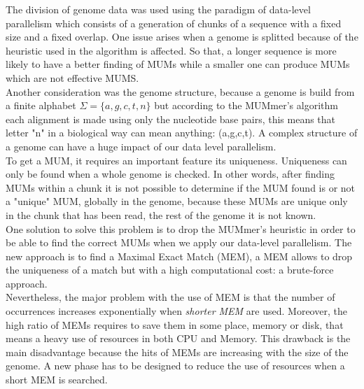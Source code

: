 \documentclass[3p,times]{elsarticle}
\begin{document}
The division of genome data was used using the paradigm of data-level parallelism which consists of a generation of chunks of a sequence with a fixed size and a fixed overlap. One issue arises when a genome is splitted because of the heuristic used in the algorithm is affected. So that, a longer sequence is more likely to have a better finding of MUMs while a smaller one can produce MUMs which are not effective MUMS.\\
Another consideration was the genome structure, because a genome is build from a finite alphabet $\Sigma=\{a,g,c,t,n\}$ but according to the MUMmer's algorithm each alignment is made using only the nucleotide base pairs, this means that letter "n" in a biological way can mean anything: (a,g,c,t). A complex structure of a genome can have a huge impact of our data level parallelism.\\
To get a MUM, it requires an important feature its uniqueness. 
Uniqueness can only be found when a whole genome is checked.
In other words, after finding MUMs within a chunk it is not possible to determine if the MUM found is or not a "unique" MUM, globally in the genome,  because these MUMs are unique only in the chunk that has been read, the rest of the genome it is not known.\\
One solution to solve this problem is to drop the MUMmer's heuristic in order to be able to find the correct MUMs when we apply our data-level parallelism. The new approach is to find a Maximal Exact Match (MEM), a MEM allows to drop the uniqueness of a match but with a high computational cost: a brute-force approach.\\
Nevertheless, the major problem with the use of MEM is that the number of occurrences increases exponentially when \emph{shorter MEM} are used. Moreover, the high ratio of MEMs requires to save them in some place, memory or disk, that means a heavy use of resources in both CPU and Memory. This drawback is the main disadvantage because the hits of MEMs are increasing with the size of the genome. A new phase has to be designed to reduce the use of resources when a short MEM is searched.
\end{document}
